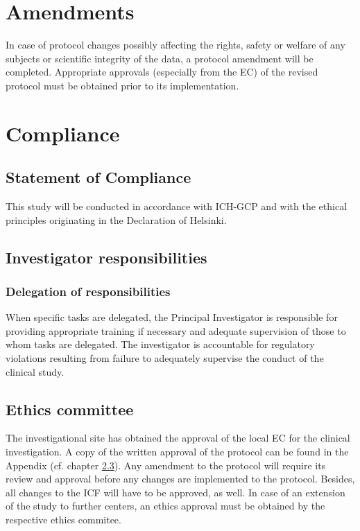 \section{Amendments}
In case of protocol changes possibly affecting the rights, safety or welfare of any subjects or scientific integrity of the data, a protocol amendment will be completed. Appropriate approvals (especially from the \ac{EC}) of the revised protocol must be obtained prior to its implementation.

\section{Compliance}
\subsection{Statement of Compliance}
This study will be conducted in accordance with ICH-GCP and with the ethical principles originating in the Declaration of Helsinki. 

\subsection{Investigator responsibilities}

\subsubsection{Delegation of responsibilities}
When specific tasks are delegated, the Principal Investigator is responsible for providing appropriate training if necessary and adequate supervision of those to whom tasks are delegated. The investigator is accountable for regulatory violations resulting from failure to adequately supervise the conduct of the clinical study. 

\subsection{Ethics committee}
The investigational site has obtained the approval of the local \acl{EC} for the clinical investigation. A copy of the written approval of the protocol can be found in the Appendix (cf. chapter \ref{}). Any amendment to the protocol will require its review and approval before any changes are implemented to the protocol. Besides, all changes to the \ac{ICF} will have to be approved, as well. In case of an extension of the study to further centers, an ethics approval must be obtained by the respective ethics commitee. 

